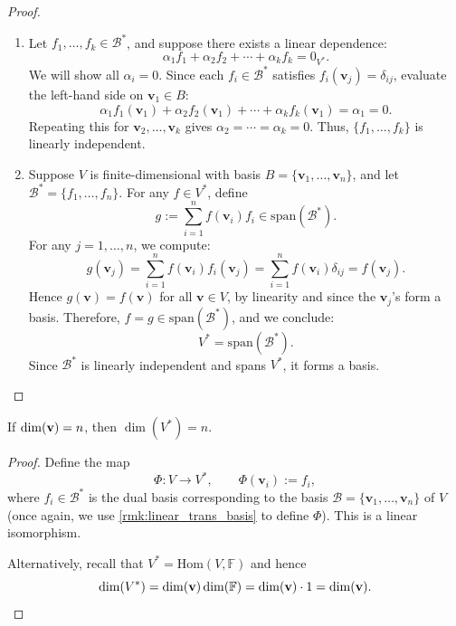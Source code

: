 \begin{proof}
\begin{enumerate}
  \item Let \( f_1, \ldots, f_k \in \mathcal{B}^* \), and suppose there exists a linear dependence:
  \[
  \alpha_1 f_1 + \alpha_2 f_2 + \cdots + \alpha_k f_k = 0_{V^*}.
  \]
  We will show all \( \alpha_i = 0 \). Since each \( f_i \in \mathcal{B}^* \) satisfies \( f_i(\mathbf{v}_j) = \delta_{ij} \), evaluate the left-hand side on \( \mathbf{v}_1 \in B \):
  \[
  \alpha_1 f_1(\mathbf{v}_1) + \alpha_2 f_2(\mathbf{v}_1) + \cdots + \alpha_k f_k(\mathbf{v}_1) = \alpha_1 = 0.
  \]
  Repeating this for \( \mathbf{v}_2, \ldots, \mathbf{v}_k \) gives \( \alpha_2 = \cdots = \alpha_k = 0 \). Thus, \( \{ f_1, \ldots, f_k \} \) is linearly independent.

  \item Suppose \( V \) is finite-dimensional with basis \( B = \{ \mathbf{v}_1, \ldots, \mathbf{v}_n \} \), and let \( \mathcal{B}^* = \{ f_1, \ldots, f_n \} \). For any \( f \in V^* \), define
  \[
  g := \sum_{i=1}^n f(\mathbf{v}_i) f_i \in \mathrm{span}(\mathcal{B}^*).
  \]
  For any \( j = 1, \ldots, n \), we compute:
  \[
  g(\mathbf{v}_j) = \sum_{i=1}^n f(\mathbf{v}_i) f_i(\mathbf{v}_j) = \sum_{i=1}^n f(\mathbf{v}_i) \delta_{ij} = f(\mathbf{v}_j).
  \]
  Hence \( g(\mathbf{v}) = f(\mathbf{v}) \) for all \( \mathbf{v} \in V \), by linearity and since the \( \mathbf{v}_j \)'s form a basis. Therefore, \( f = g \in \mathrm{span}(\mathcal{B}^*) \), and we conclude:
  \[
  V^* = \mathrm{span}(\mathcal{B}^*).
  \]
  Since \( \mathcal{B}^* \) is linearly independent and spans \( V^* \), it forms a basis.
\end{enumerate}
\end{proof}

\begin{corollary}\label{cor: dual-dim-equality}
If \( \dim({\bf v}) = n \), then \( \dim(V^*) = n \).
\end{corollary}

\begin{proof}
Define the map
\[
\Phi: V \longrightarrow V^*, \qquad \Phi(\mathbf{v}_i) := f_i,
\]
where \( f_i \in \mathcal{B}^* \) is the dual basis corresponding to the basis \( \mathcal{B} = \{ \mathbf{v}_1, \dots, \mathbf{v}_n \} \) of \( V \) (once again, we use \autoref{rmk:linear_trans_basis} to define $\Phi$). This is a linear isomorphism.

Alternatively, recall that $V^* = \mathrm{Hom}(V,\mathbb{F})$ and hence
$$\dim(V^*) = \dim({\bf v})\dim(\mathbb{F}) = \dim({\bf v}) \cdot 1 = \dim({\bf v}).$$
\end{proof}


